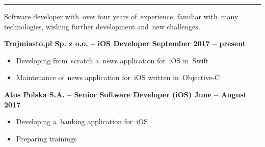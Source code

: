 \documentclass[11pt,a4paper]{article}
\newcommand*\header[1]{
    \noindent\raisebox{.1cm}{\color{MidnightBlue}\rule{1.5cm}{.1cm}\hspace{.2cm}\raisebox{-.1cm}{\large\bf #1}}}
\begin{document}
    \vspace{-.5cm}

    \noindent\rule{\textwidth}{.5mm}


    \bigskip

    \noindent
    Software developer with~over four years of~experience, familiar with~many technologies, wishing further development
    and~new challenges.


    \bigskip

    \header{Experience}

    \smallskip

    {\bf Trojmiasto.pl Sp. z o.o. -- iOS Developer \hfill September 2017 -- present}

    \vspace{-.23cm}
    \begin{itemize}[leftmargin=1.5cm] \itemsep.2mm \parskip0mm 
        \item Developing from~scratch a~news application for~iOS in~Swift
        \item Maintenance of~news application for~iOS written in~Objective-C
    \end{itemize}

    \vspace{-.17cm}

    {\bf Atos Polska S.A. -- Senior Software Developer (iOS) \hfill June -- August 2017}

    \vspace{-.23cm}
    \begin{itemize}[leftmargin=1.5cm] \itemsep.2mm \parskip0mm 
        \item Developing a~banking application for~iOS
        \item Preparing trainings
    \end{itemize}

    \vspace{-.17cm}
\end{document}
